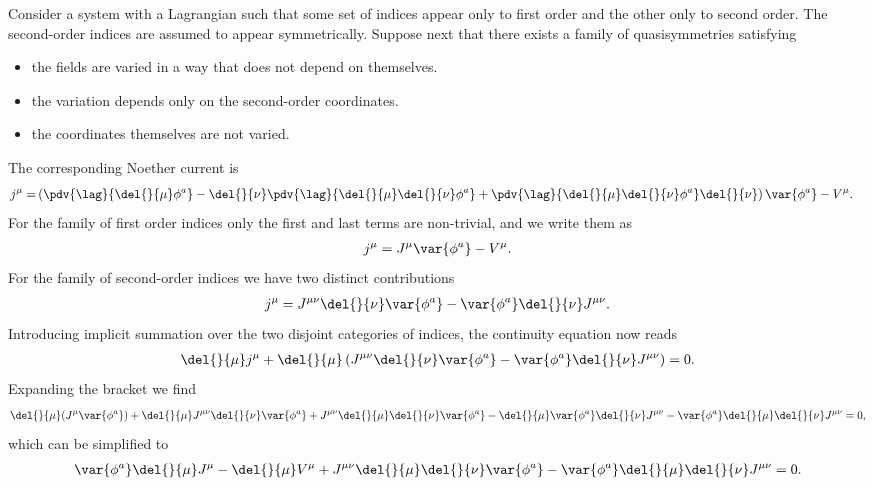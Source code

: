 Consider a system with a Lagrangian such that some set of indices appear only to first order and the other only to second order. The second-order indices are assumed to appear symmetrically. Suppose next that there exists a family of quasisymmetries satisfying
\begin{itemize}
	\item the fields are varied in a way that does not depend on themselves.
	\item the variation depends only on the second-order coordinates.
	\item the coordinates themselves are not varied.
\end{itemize}
The corresponding Noether current is
\begin{align*}
	j^{\mu} =& \left(\pdv{\lag}{\del{}{\mu}\phi^{a}} - \del{}{\nu}\pdv{\lag}{\del{}{\mu}\del{}{\nu}\phi^{a}} + \pdv{\lag}{\del{}{\mu}\del{}{\nu}\phi^{a}}\del{}{\nu}\right)\var{\phi^{a}} - V^{\mu}.
\end{align*}
For the family of first order indices only the first and last terms are non-trivial, and we write them as
\begin{align*}
	j^{\mu} = J^{\mu}\var{\phi^{a}} - V^{\mu}.
\end{align*}
For the family of second-order indices we have two distinct contributions
\begin{align*}
	j^{\mu} = J^{\mu\nu}\del{}{\nu}\var{\phi^{a}} - \var{\phi^{a}}\del{}{\nu}J^{\mu\nu}.
\end{align*}
Introducing implicit summation over the two disjoint categories of indices, the continuity equation now reads
\begin{align*}
	\del{}{\mu}j^{\mu} + \del{}{\mu}\left(J^{\mu\nu}\del{}{\nu}\var{\phi^{a}} - \var{\phi^{a}}\del{}{\nu}J^{\mu\nu}\right) = 0.
\end{align*}
Expanding the bracket we find
\begin{align*}
	\del{}{\mu}(J^{\mu}\var{\phi^{a}}) + \del{}{\mu}J^{\mu\nu}\del{}{\nu}\var{\phi^{a}} + J^{\mu\nu}\del{}{\mu}\del{}{\nu}\var{\phi^{a}} - \del{}{\mu}\var{\phi^{a}}\del{}{\nu}J^{\mu\nu} - \var{\phi^{a}}\del{}{\mu}\del{}{\nu}J^{\mu\nu} = 0,
\end{align*}
which can be simplified to
\begin{align*}
	\var{\phi^{a}}\del{}{\mu}J^{\mu} - \del{}{\mu}V^{\mu} + J^{\mu\nu}\del{}{\mu}\del{}{\nu}\var{\phi^{a}} - \var{\phi^{a}}\del{}{\mu}\del{}{\nu}J^{\mu\nu} = 0.
\end{align*}